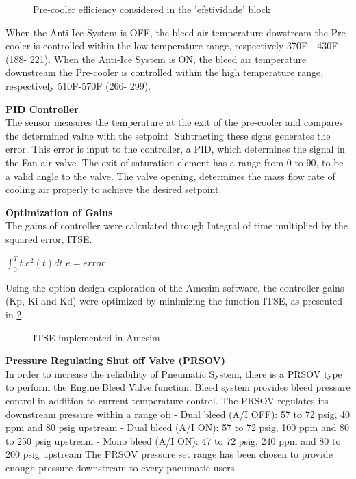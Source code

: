 \begin{figure}[H] %
\caption{Pre-cooler efficiency considered in the 'efetividade' block}
\label{fig:Efficiency}
\end{figure}

When the Anti-Ice System is OFF, the bleed air temperature dowstream the Pre-cooler is controlled within the low temperature range, respectively 370\degree F - 430\degree F (188\celsius- 221\celsius). When the Anti-Ice System is ON, the bleed air temperature downstream the Pre-cooler is controlled within the high temperature range, respectively 510\degree F-570\degree F (266\celsius - 299\celsius).

\textbf{PID Controller}\\
The sensor measures the temperature at the exit of the pre-cooler and compares the determined value with the setpoint. Subtracting these signs generates the error. This error is input to the controller, a PID, which determines the signal in the Fan air valve. The exit of saturation element has a range from 0 to 90, to be a valid angle to the valve. The valve opening, determines the mass flow rate of cooling air properly to achieve the desired setpoint.

\textbf{Optimization of Gains}\\
The gains of controller were calculated through Integral of time multiplied by the squared error, ITSE.

$\int_{0}^{T}t.e^{2}\left ( t \right )dt$
$e=error$

Using the option design exploration of the Amesim software, the controller gains (Kp, Ki and Kd) were optimized by minimizing the function ITSE, as presented in \ref{fig:ITSE}.

\begin{figure}[H] %
\caption{ITSE implemented in Amesim}
\label{fig:ITSE}
\end{figure}

\textbf{Pressure Regulating Shut off Valve (PRSOV)}\\
In order to increase the reliability of Pneumatic System, there is a PRSOV type to perform the Engine Bleed Valve function. Bleed system provides bleed pressure control in addition to current temperature control. The PRSOV regulates its downstream pressure within a range of:
- Dual bleed (A/I OFF): 57 to 72 psig, 40 ppm and 80 psig upstream
- Dual bleed (A/I ON): 57 to 72 psig, 100 ppm and 80 to 250 psig upstream
- Mono bleed (A/I ON): 47 to 72 psig, 240 ppm and 80 to 200 psig upstream
The PRSOV pressure set range has been chosen to provide enough pressure downstream to every pneumatic users

